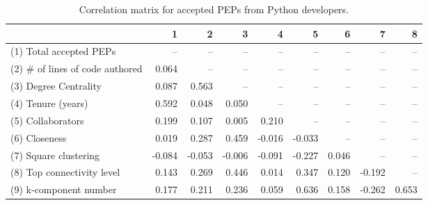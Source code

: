 \begin{table}[H]
\caption{Correlation matrix for accepted PEPs from Python developers.}
\label{corr_table_zinfl}
\begin{center}
\begin{tabular}{lrrrrrrrr}
\toprule
{} &      1 &      2 &      3 &      4 &      5 &     6 &      7 &     8 \\
\midrule
(1) Total accepted PEPs         &    -- &    -- &    -- &    -- &    -- &   -- &    -- &   -- \\
(2) \# of lines of code authored &  0.064 &    -- &    -- &    -- &    -- &   -- &    -- &   -- \\
(3) Degree Centrality           &  0.087 &  0.563 &    -- &    -- &    -- &   -- &    -- &   -- \\
(4) Tenure (years)              &  0.592 &  0.048 &  0.050 &    -- &    -- &   -- &    -- &   -- \\
(5) Collaborators               &  0.199 &  0.107 &  0.005 &  0.210 &    -- &   -- &    -- &   -- \\
(6) Closeness                   &  0.019 &  0.287 &  0.459 & -0.016 & -0.033 &   -- &    -- &   -- \\
(7) Square clustering           & -0.084 & -0.053 & -0.006 & -0.091 & -0.227 & 0.046 &    -- &   -- \\
(8) Top connectivity level      &  0.143 &  0.269 &  0.446 &  0.014 &  0.347 & 0.120 & -0.192 &   -- \\
(9) k-component number          &  0.177 &  0.211 &  0.236 &  0.059 &  0.636 & 0.158 & -0.262 & 0.653 \\
\bottomrule
\end{tabular}
\end{center} 
\end{table}
